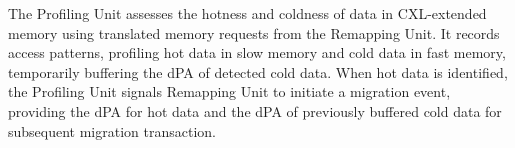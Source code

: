 The Profiling Unit assesses the hotness and coldness of data in CXL-extended memory using translated memory requests from the Remapping Unit. It records access patterns, profiling hot data in slow memory and cold data in fast memory, temporarily buffering the dPA of detected cold data. When hot data is identified, the Profiling Unit signals Remapping Unit to initiate a migration event, providing the dPA for hot data and the dPA of previously buffered cold data for subsequent migration transaction.


